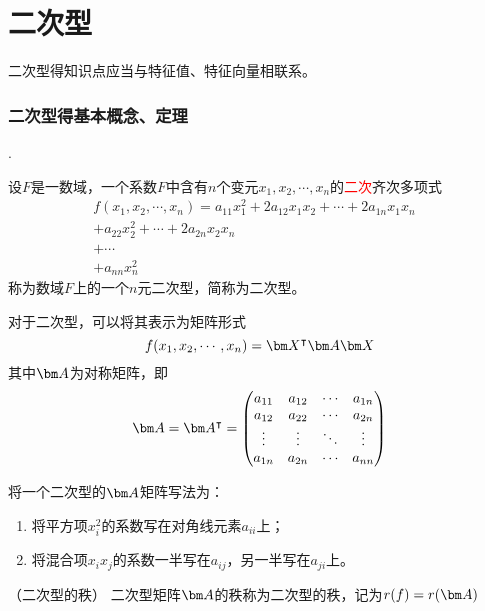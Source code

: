 \part{二次型}
二次型得知识点应当与特征值、特征向量相联系。
\section{二次型得基本概念、定理}
.
\begin{definition}
    设$F$是一数域，一个系数$F$中含有$n$个变元$x_1,x_2,\cdots,x_n$的\textcolor{red}{二次}齐次多项式
    \begin{align*}
        f(x_1,x_2,\cdots,x_n) = a_{11}x_1^2 + 2a_{12}x_1x_2 + \cdots + 2a_{1n}x_1x_n & \\
        +a_{22}x_2^2 + \cdots + 2a_{2n}x_2x_n                                        & \\
        +\cdots                                                                      & \\
        +a_{nn}x_n^2                                                                 &
    \end{align*}
    称为数域$F$上的一个$n$元二次型，简称为二次型。
\end{definition}

对于二次型，可以将其表示为矩阵形式
\begin{equation}
    f(x_1,x_2,\cdots,x_n) = \mat{X}^\intercal \mat{A}\mat{X}
\end{equation}
其中$\mat{A}$为对称矩阵，即
\[
    \mat{A} =\mat{A}^\intercal =
    \begin{pmatrix}
        a_{11} & a_{12} & \cdots & a_{1n} \\
        a_{12} & a_{22} & \cdots & a_{2n} \\
        \vdots & \vdots & \ddots & \vdots \\
        a_{1n} & a_{2n} & \cdots & a_{nn}
    \end{pmatrix}
\]

将一个二次型的$\mat{A}$矩阵写法为：
\begin{enumerate}
    \item 将平方项$x_i^2$的系数写在对角线元素$a_{ii}$上；
    \item 将混合项$x_ix_j$的系数一半写在$a_{ij}$，另一半写在$a_{ji}$上。
\end{enumerate}

\begin{definition}
    （二次型的秩）
    二次型矩阵$\mat{A}$的秩称为二次型的秩，记为$r(f)=r(\mat{A})$
\end{definition}

